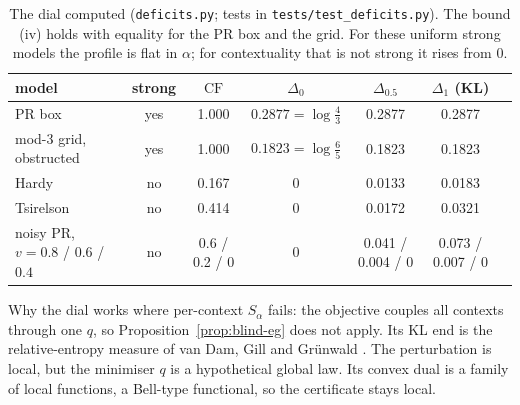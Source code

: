 \documentclass[11pt]{article}
\theoremstyle{definition}
\theoremstyle{remark}
\newcommand{\CF}{\mathrm{CF}}
\newcommand{\st}[1]{\textsf{\small\color{gray}#1}}
\begin{document}
\begin{table}[!htbp]\centering\small
{\setlength\tabcolsep{3pt}\begin{tabular}{lcccccc}
\toprule
model & strong & $\CF$ & $\Delta_0$ & $\Delta_{0.5}$ & $\Delta_1$ (KL)\\
\midrule
PR box & yes & 1.000 & $0.2877=\log\frac43$ & 0.2877 & 0.2877\\
mod-3 grid, obstructed & yes & 1.000 & $0.1823=\log\frac65$ & 0.1823 & 0.1823\\
Hardy & no & 0.167 & 0 & 0.0133 & 0.0183\\
Tsirelson & no & 0.414 & 0 & 0.0172 & 0.0321\\
noisy PR, $v=0.8$ / $0.6$ / $0.4$ & no & 0.6 / 0.2 / 0 & 0 & 0.041 / 0.004 / 0 & 0.073 / 0.007 / 0\\
\bottomrule
\end{tabular}}
\caption{The dial \st{computed} (\texttt{deficits.py}; tests in \texttt{tests/test\_deficits.py}). The bound (iv) holds with equality for the PR box and the grid. For these uniform strong models the profile is flat in $\alpha$; for contextuality that is not strong it rises from $0$.}
\end{table}

\noindent Why the dial works where per-context $S_\alpha$ fails: the objective couples all contexts through one $q$, so Proposition~\ref{prop:blind-eg} does not apply. Its KL end is the relative-entropy measure of van Dam, Gill and Gr\"unwald \cite{vdgg}. The perturbation is local, but the minimiser $q$ is a hypothetical global law. Its convex dual is a family of local functions, a Bell-type functional, so the certificate stays local.
\end{document}
